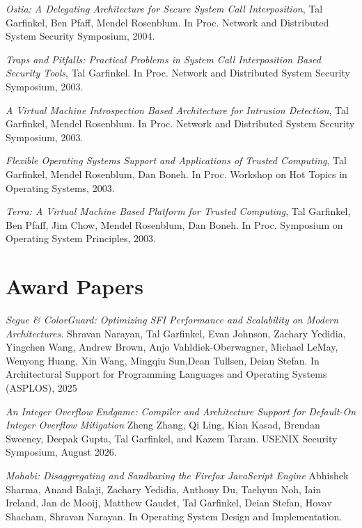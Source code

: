 \begin{resume}
{\em Ostia: A Delegating Architecture for Secure System Call Interposition},
Tal Garfinkel, Ben Pfaff, Mendel Rosenblum.  In Proc. Network and Distributed
System Security Symposium, 2004.

{\em Traps and Pitfalls: Practical Problems in System Call Interposition
Based Security Tools}, Tal Garfinkel.  In Proc. Network and Distributed System
Security Symposium, 2003.

{\em A Virtual Machine Introspection Based Architecture for Intrusion
Detection}, Tal Garfinkel, Mendel Rosenblum.  In Proc. Network and Distributed
System Security Symposium, 2003.

{\em Flexible Operating Systems Support and Applications of Trusted Computing}, Tal Garfinkel, Mendel
Rosenblum, Dan Boneh. In Proc. Workshop on Hot Topics in Operating Systems, 2003.


{\em Terra: A Virtual Machine Based Platform for Trusted Computing}, Tal
Garfinkel, Ben Pfaff, Jim Chow, Mendel Rosenblum, Dan Boneh. In Proc. Symposium
on Operating System Principles, 2003.


\section{\sc Award Papers}

{\em Segue \& ColorGuard: Optimizing SFI Performance and Scalability on Modern
Architectures.} Shravan Narayan, Tal Garfinkel, Evan Johnson, Zachary Yedidia,
Yingchen  Wang, Andrew Brown, Anjo Vahldiek-Oberwagner, Michael LeMay, Wenyong
Huang, Xin Wang, Mingqiu Sun,Dean Tullsen, Deian Stefan. In
Architectural Support for Programming Languages and Operating Systems (ASPLOS),
2025

{\it An Integer Overflow Endgame: Compiler and Architecture Support for
Default-On Integer Overflow Mitigation} Zheng Zhang, Qi Ling, Kian Kasad,
Brendan Sweeney, Deepak Gupta, Tal Garfinkel, and Kazem Taram. 
USENIX Security Symposium, August 2026.


{\it Mohabi: Disaggregating and Sandboxing the Firefox JavaScript Engine}
Abhishek Sharma, Anand Balaji, Zachary Yedidia, Anthony Du, Taehyun Noh, Iain
Ireland, Jan de Mooij, Matthew Gaudet, Tal Garfinkel, Deian Stefan, Hovav
Shacham, Shravan Narayan. In Operating System Design and Implementation.


\end{resume}
